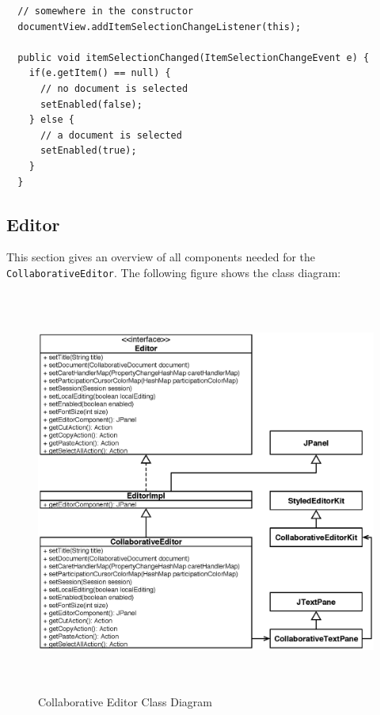 \begin{verbatim}
  // somewhere in the constructor
  documentView.addItemSelectionChangeListener(this);

  public void itemSelectionChanged(ItemSelectionChangeEvent e) {
    if(e.getItem() == null) {
      // no document is selected
      setEnabled(false);
    } else {
      // a document is selected
      setEnabled(true);
    }
  }
\end{verbatim}


\subsection{Editor}
This section gives an overview of all components needed for the \texttt{Collaborative\-Editor}. The following figure shows the class diagram:
\begin{figure}[H]
\begin{center}
  \includegraphics[height=5.25in, width=5.55in]{../images/finalreport/application_editor.eps}
\caption{Collaborative Editor Class Diagram}
\label{application_editor}
\end{center}
\end{figure}

